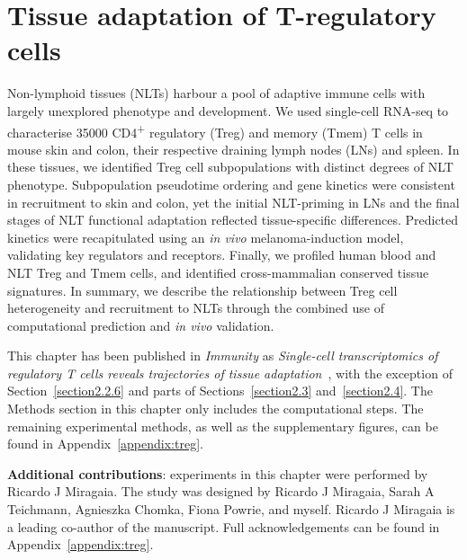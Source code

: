 
\chapter{Tissue adaptation of T-regulatory cells} \label{chap:Treg}

\ifpdf
    \graphicspath{{Chapter2/Figs/Raster/}{Chapter2/Figs/PDF/}{Chapter2/Figs/}}
\else
    \graphicspath{{Chapter2/Figs/Vector/}{Chapter2/Figs/}}
\fi

Non-lymphoid tissues (NLTs) harbour a pool of adaptive immune cells with largely unexplored phenotype and development. We used single-cell RNA-seq to characterise 35000 CD4\textsuperscript{+} regulatory (Treg) and memory (Tmem) T cells in mouse skin and colon, their respective draining lymph nodes (LNs) and spleen. In these tissues, we identified Treg cell subpopulations with distinct degrees of NLT phenotype. Subpopulation pseudotime ordering and gene kinetics were consistent in recruitment to skin and colon, yet the initial NLT-priming in LNs and the final stages of NLT functional adaptation reflected tissue-specific differences. Predicted kinetics were recapitulated using an \textit{in vivo} melanoma-induction model, validating key regulators and receptors. Finally, we profiled human blood and NLT Treg and Tmem cells, and identified cross-mammalian conserved tissue signatures. In summary, we describe the relationship between Treg cell heterogeneity and recruitment to NLTs through the combined use of computational prediction and \textit{in vivo} validation.

This chapter has been published in \textit{Immunity} as \textit{Single-cell transcriptomics of regulatory T cells reveals trajectories of tissue adaptation}~\citep{miragaia_single-cell_2019}, with the exception of Section~\ref{section2.2.6} and parts of Sections~\ref{section2.3} and~\ref{section2.4}. The Methods section in this chapter only includes the computational steps. The remaining experimental methods, as well as the supplementary figures, can be found in Appendix~\ref{appendix:treg}.

\textbf{Additional contributions}: experiments in this chapter were performed by Ricardo J Miragaia. The study was designed by Ricardo J Miragaia, Sarah A Teichmann, Agnieszka Chomka, Fiona Powrie, and myself. Ricardo J Miragaia is a leading co-author of the manuscript. Full acknowledgements can be found in Appendix~\ref{appendix:treg}.


